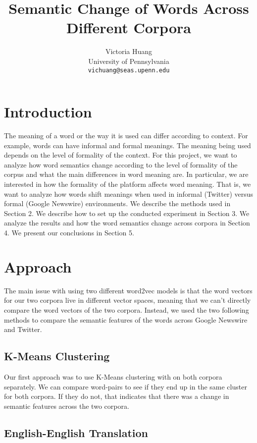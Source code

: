 \documentclass[11pt,a4paper]{article}
\title{Semantic Change of Words Across Different Corpora}
\author{Victoria Huang \\
  University of Pennsylvania \\
  {\tt vichuang@seas.upenn.edu}\\}
\date{}
\begin{document}
\maketitle

\section{Introduction}
The meaning of a word or the way it is used can differ according to context. For example, words can have informal and formal meanings. The meaning being used depends on the level of formality of the context. For this project, we want to analyze how word semantics change according to the level of formality of the corpus and what the main differences in word meaning are. In particular, we are interested in how the formality of the platform affects word meaning. That is, we want to analyze how words shift meanings when used in informal (Twitter) versus formal (Google Newswire) environments. We describe the methods used in Section 2. We describe how to set up the conducted experiment in Section 3. We analyze the results and how the word semantics change across corpora in Section 4. We present our conclusions in Section 5.

\section{Approach}

The main issue with using two different word2vec models is that the word vectors for our two corpora live in different vector spaces, meaning that we can't directly compare the word vectors of the two corpora. Instead, we used the two following methods to compare the semantic features of the words across Google Newswire and Twitter.

\subsection{K-Means Clustering}

Our first approach was to use K-Means clustering with on both corpora separately. We can compare word-pairs to see if they end up in the same cluster for both corpora. If they do not, that indicates that there was a change in semantic features across the two corpora.

\subsection{English-English Translation}
\end{document}
